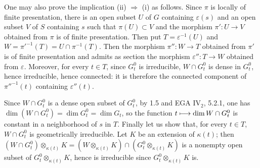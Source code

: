 One may also prove the implication (ii) $\Rightarrow$ (i) as follows. Since $\pi$ is locally of finite presentation, there is an open subset $U$ of $G$ containing $\varepsilon(s)$ and an open subset $V$ of $S$ containing $s$ such that $\pi(U)\subset V$ and the morphism $\pi':U\to V$ obtained from $\pi$ is of finite presentation. Then put $T=\varepsilon^{-1}(U)$ and $W=\pi'^{-1}(T)=U\cap\pi^{-1}(T)$. Then the morphism $\pi'':W\to T$ obtained from $\pi'$ is of finite presentation and admits as section the morphism $\varepsilon'':T\to W$ obtained from $\varepsilon$. Moreover, for every $t\in T$, since $G_t^0$ is irreducible, $W\cap G_t^0$ is dense in $G_t^0$, hence irreducible, hence connected: it is therefore the connected component of $\pi''^{-1}(t)$ containing $\varepsilon''(t)$.

Since $W\cap G_t^0$ is a dense open subset of $G_t^0$, by 1.5 and EGA IV$_2$, 5.2.1, one has $\dim(W\cap G_t^0)=\dim G_t^0=\dim G_t$, so the function $t\longmapsto\dim W\cap G_t^0$ is constant in a neighborhood of $s$ in $T$. Finally let us show that, for every $t\in T$, $W\cap G_t^0$ is geometrically irreducible. Let $K$ be an extension of $\kappa(t)$; then $(W\cap G_t^0)\otimes_{\kappa(t)}K=(W\otimes_{\kappa(t)}K)\cap(G_t^0\otimes_{\kappa(t)}K)$ is a nonempty open subset of $G_t^0\otimes_{\kappa(t)}K$, hence is irreducible since $G_t^0\otimes_{\kappa(t)}K$ is.

